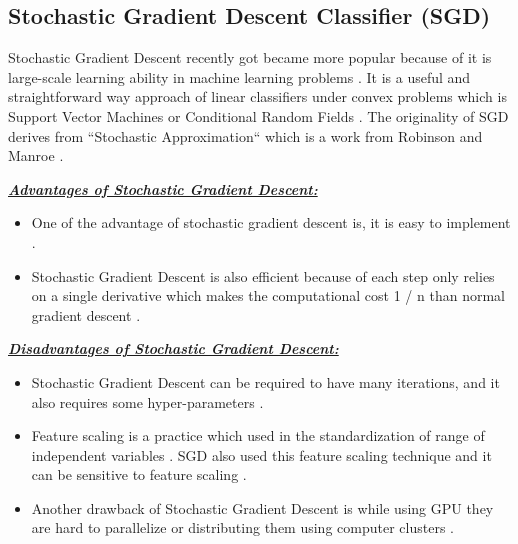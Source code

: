 \documentclass[sigconf]{acmart}
\begin{document}
\subsection{Stochastic Gradient Descent Classifier (SGD)}

Stochastic Gradient Descent recently got became more popular because of it is large-scale learning ability in machine learning problems \cite{fan-stochastic}. It is a useful and straightforward way approach of linear classifiers under convex problems which is Support Vector Machines or Conditional Random Fields \cite{www-bottou}. The originality of SGD derives from ``Stochastic Approximation`` which is a work from Robinson and Manroe \cite{Needell2016}. 

\textbf{\underline{\textit{Advantages of Stochastic Gradient Descent:}}}

\begin{itemize}
\item One of the advantage of stochastic gradient descent is, it is easy to implement \cite{www-scikit-stochastic-gradient}.
\item Stochastic Gradient Descent is also efficient because of each step only relies on a single derivative which makes the computational cost  {1} / {n} than normal gradient descent \cite{NIPS2013_4937}.
\end{itemize}

\textbf{\underline{\textit{Disadvantages of Stochastic Gradient Descent:}}}

\begin{itemize}
\item Stochastic Gradient Descent can be required to have many iterations, and it also requires some hyper-parameters \cite{www-scikit-stochastic-gradient}. 
\item Feature scaling is a practice which used in the standardization of range of independent variables \cite{www-wikipedia-futurescaling}. SGD also used this feature scaling technique and it can be sensitive to feature scaling \cite{www-scikit-stochastic-gradient}. 
\item Another drawback of Stochastic Gradient Descent is while using GPU they are hard to parallelize or distributing them using computer clusters \cite{andrewng-deeplearning}. 
\end{itemize}
\end{document}
